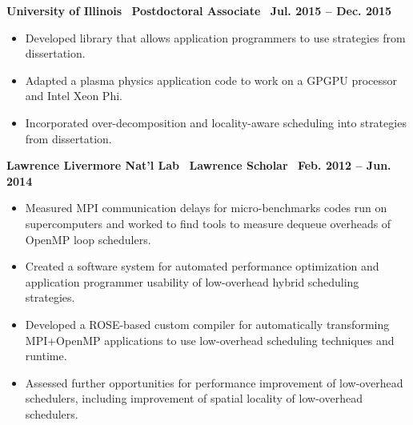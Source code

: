 \textbf{ University of Illinois$\>$$\>$$\>$$\>$Postdoctoral Associate$\>$$\>$$\>$$\>$Jul. 2015 – Dec. 2015}
\vspace*{-0.0in}
\begin{itemize} 
\item Developed library that allows application programmers to use strategies from dissertation.
\item Adapted a plasma physics application code to work on a
GPGPU processor and Intel Xeon Phi.
\item Incorporated over-decomposition and locality-aware scheduling into strategies from dissertation.
\end{itemize}

\textbf{Lawrence Livermore Nat’l Lab$\>$$\>$$\>$$\>$Lawrence Scholar$\>$$\>$$\>$$\>$Feb. 2012 – Jun. 2014}
\vspace*{-0.0in}
\begin{itemize} 
\item Measured MPI communication delays for micro-benchmarks codes run on supercomputers and worked to find tools to measure dequeue overheads of OpenMP loop schedulers.
\item Created a software system for automated performance optimization and application programmer usability of low-overhead hybrid scheduling
strategies.
\item Developed a ROSE-based custom compiler for automatically transforming MPI+OpenMP applications to use low-overhead scheduling
techniques and runtime.
\item Assessed further opportunities for performance improvement of low-overhead schedulers, including improvement of spatial locality
of low-overhead schedulers.
\end{itemize}
